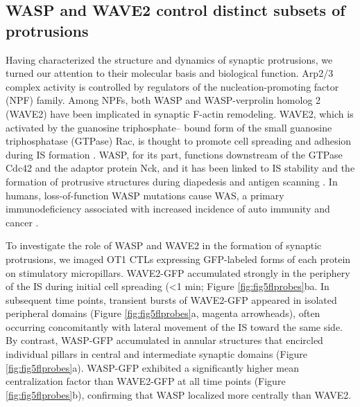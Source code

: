 \subsection{WASP and WAVE2 control distinct subsets of protrusions}
Having characterized the structure and dynamics of synaptic protrusions, we turned our attention to their molecular basis and biological function. Arp2/3 complex activity is controlled by regulators of the nucleation-promoting factor (NPF) family. Among NPFs, both WASP and WASP-verprolin homolog 2 (WAVE2) have been implicated in synaptic F-actin remodeling. WAVE2, which is activated by the guanosine triphosphate– bound form of the small guanosine triphosphatase (GTPase) Rac, is thought to promote cell spreading and adhesion during IS formation \cite{LeFloch2013, Nolz2006, Zipfel2006, Nolz2008}. WASP, for its part, functions downstream of the GTPase Cdc42 and the adaptor protein Nck, and it has been linked to IS stability and the formation of protrusive structures during diapedesis and antigen scanning \cite{Kumari2015, Sims2007, Calvez2011, Carman2007}. In humans, loss-of-function WASP mutations cause WAS, a primary immunodeficiency associated with increased incidence of auto immunity and cancer \cite{Rivers2017, Massaad2013}.

To investigate the role of WASP and WAVE2 in the formation of synaptic protrusions, we imaged OT1 CTLs expressing GFP-labeled forms of each protein on stimulatory micropillars. WAVE2-GFP accumulated strongly in the periphery of the IS during initial cell spreading (\textless 1 min; Figure \ref{fig:fig5flprobes}ba. In subsequent time points, transient bursts of WAVE2-GFP appeared in isolated peripheral domains (Figure \ref{fig:fig5flprobes}a, magenta arrowheads), often occurring concomitantly with lateral movement of the IS toward the same side. By contrast, WASP-GFP accumulated in annular structures that encircled individual pillars in central and intermediate synaptic domains (Figure \ref{fig:fig5flprobes}a). WASP-GFP exhibited a significantly higher mean centralization factor than WAVE2-GFP at all time points (Figure \ref{fig:fig5flprobes}b), confirming that WASP localized more centrally than WAVE2.

